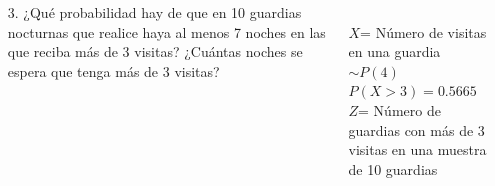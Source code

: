 \documentclass[aspectratio=149,10pt,xcolor=dvipsnames,t]{beamer}
\begin{document}
\begin{frame}
\begin{columns}
\begin{column}[T]{0.59\textwidth}
\begin{enumerate}
\item[3.]¿Qué probabilidad hay de que en 10 guardias nocturnas que realice haya al menos 7 noches en las que reciba más de
3 visitas? ¿Cuántas noches se espera que tenga más de 3 visitas? 
\end{enumerate}
\end{column}
\begin{column}[T]{0.4\textwidth}
\\
$X$= Número de visitas en una guardia $\sim P(4)$\\
$P(X>3)=0.5665$\\
$Z$= Número de guardias con más de 3 visitas en una muestra de 10 guardias
\end{column}
\end{columns}
\end{frame}
\end{document}
